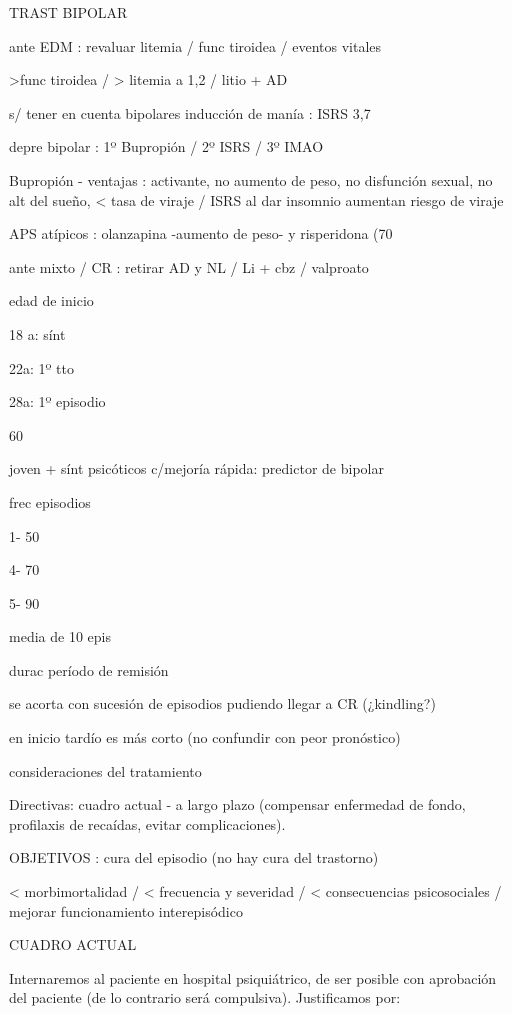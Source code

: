 \documentclass{scrbook}
\begin{document}
TRAST BIPOLAR

ante EDM : revaluar litemia / func tiroidea / eventos vitales

>func tiroidea / > litemia a 1,2 / litio + AD

s/ tener en cuenta bipolares inducción de manía : ISRS 3,7%

depre bipolar : 1º Bupropión / 2º ISRS / 3º IMAO

Bupropión - ventajas : activante, no aumento de peso, no disfunción sexual, no alt del sueño, < tasa de viraje / ISRS al dar insomnio aumentan riesgo de viraje

APS atípicos : olanzapina -aumento de peso- y risperidona (70%

ante mixto / CR : retirar AD y NL / Li + cbz / valproato

edad de inicio

18 a: sínt

22a: 1º tto

28a: 1º episodio

60%

joven + sínt psicóticos c/mejoría rápida: predictor de bipolar

frec episodios

1- 50%

4- 70%

5- 90%

media de 10 epis

durac período de remisión

se acorta con sucesión de episodios pudiendo llegar a CR (¿kindling?)

en inicio tardío es más corto (no confundir con peor pronóstico)

consideraciones del tratamiento

Directivas: cuadro actual - a largo plazo (compensar enfermedad de fondo, profilaxis de recaídas, evitar complicaciones).

OBJETIVOS : cura del episodio (no hay cura del trastorno)

< morbimortalidad / < frecuencia y severidad / < consecuencias psicosociales / mejorar funcionamiento interepisódico

CUADRO ACTUAL

Internaremos al paciente en hospital psiquiátrico, de ser posible con aprobación del paciente (de lo contrario será compulsiva). Justificamos por:
\end{document}
